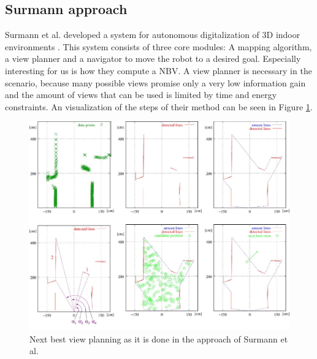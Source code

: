 \documentclass[a4paper,11pt,english]{article}
\begin{document}
\subsection{Surmann approach}
\label{background:surmann}
Surmann et al. developed a system for autonomous digitalization of 3D indoor environments \cite{surmann2003autonomous}.
This system consists of three core modules: A mapping algorithm, a view planner and a navigator to move the robot to a desired goal.
Especially interesting for us is how they compute a NBV.
A view planner is necessary in the  scenario, because many possible views promise only a very low information gain and the amount of views that can be used is limited by time and energy constraints.
An visualization of the steps of their method can be seen in Figure \ref{fig:surmann}.

\begin{figure}[h!]
	\begin{center}
		\includegraphics[width=1\textwidth]{src/nbv.png}
		\caption{Next best view planning as it is done in the approach of Surmann et al.}
		\label{fig:surmann}
	\end{center}
\end{figure}
\end{document}
